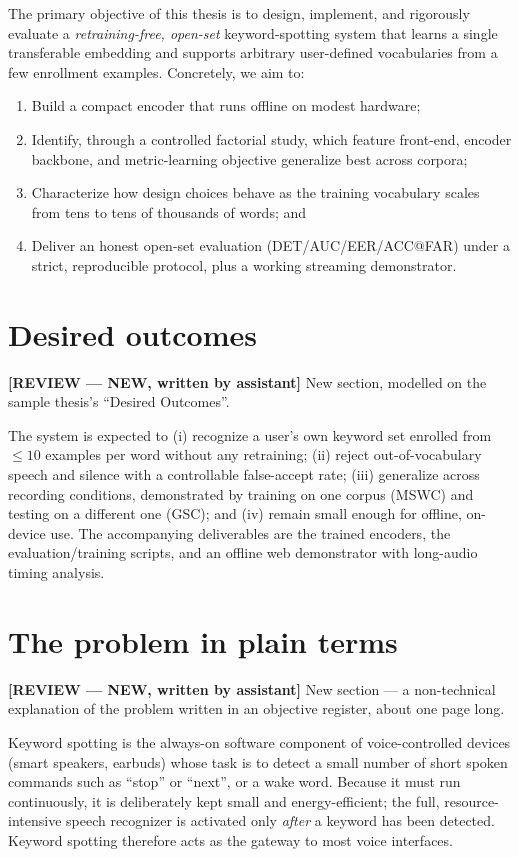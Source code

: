 \documentclass[12pt,a4paper]{report}
\newcommand{\reviewnote}[1]{%
    \par\smallskip\noindent
    \colorbox{yellow!35}{\parbox{0.97\linewidth}{\small\textbf{[REVIEW — NEW, written by assistant]}\; #1}}%
    \par\smallskip}
\newcommand{\reviewnote}[1]{}
\begin{document}
The primary objective of this thesis is to design, implement, and rigorously
evaluate a \emph{retraining-free, open-set} keyword-spotting system that learns a
single transferable embedding and supports arbitrary user-defined vocabularies
from a few enrollment examples. Concretely, we aim to:
\begin{enumerate}[leftmargin=1.5em,itemsep=2pt]
\item Build a compact encoder that runs offline on modest hardware;
\item Identify, through a controlled factorial study, which feature front-end,
encoder backbone, and metric-learning objective generalize best across corpora;
\item Characterize how design choices behave as the training vocabulary scales
from tens to tens of thousands of words; and
\item Deliver an honest open-set evaluation (DET/AUC/EER/ACC@FAR) under a strict,
reproducible protocol, plus a working streaming demonstrator.
\end{enumerate}

\section{Desired outcomes}\label{sec:outcomes}
\reviewnote{New section, modelled on the sample thesis's ``Desired Outcomes''.}

The system is expected to (i) recognize a user's own keyword set enrolled from
$\le 10$ examples per word without any retraining; (ii) reject out-of-vocabulary
speech and silence with a controllable false-accept rate; (iii) generalize across
recording conditions, demonstrated by training on one corpus (MSWC) and testing
on a different one (GSC); and (iv) remain small enough for offline, on-device use.
The accompanying deliverables are the trained encoders, the evaluation/training
scripts, and an offline web demonstrator with long-audio timing analysis.

\section{The problem in plain terms}\label{sec:plain}
\reviewnote{New section --- a non-technical explanation of the problem written in
an objective register, about one page long.}

Keyword spotting is the always-on software component of voice-controlled devices
(smart speakers, earbuds) whose task is to detect a small
number of short spoken commands such as ``stop'' or ``next'', or a wake word.
Because it must run continuously, it is deliberately kept small and
energy-efficient; the full, resource-intensive speech recognizer is activated
only \emph{after} a keyword has been detected. Keyword spotting therefore acts as
the gateway to most voice interfaces.
\end{document}
